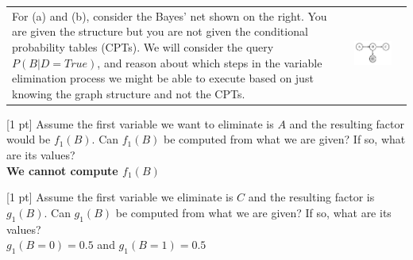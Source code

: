 
\begin{tabular}{ll}
\begin{minipage}{0.7\textwidth}
For (a) and (b), consider the Bayes' net shown on the right.  You are given
the structure but you are not given the
conditional probability tables (CPTs).  We will consider the query $P(B|D = True)$,
and reason about which steps in the variable elimination process we might be able
to execute based on just knowing the graph structure and not the CPTs.
\end{minipage}
&
\begin{minipage}{0.25\textwidth}
\centering
    \includegraphics[width=0.8\textwidth]{figs/elimination1.pdf}
\end{minipage}
\\
\end{tabular}
\begin{question}{[1 pt]}
Assume the first variable we want to eliminate is $A$ and the
resulting factor would be $f_1(B)$. Can $f_1(B)$ be computed from what we are given? If so, what are its values?\\
\vspace{1.4cm} \textbf{We cannot compute $f_1(B)$}
\end{question}

\begin{question}{[1 pt]}
Assume the first variable we eliminate is $C$ and the resulting factor is $g_1(B)$. Can $g_1(B)$ be computed from what we are given? If so, what are its values?\\
\vspace{1.4cm} $g_1(B=0)=0.5$ and $g_1(B=1)=0.5$
\end{question}

